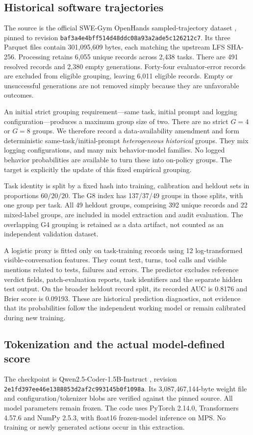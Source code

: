 \subsection{Historical software trajectories}\label{app:historical}
The source is the official SWE-Gym OpenHands sampled-trajectory dataset \citep{swegymdata,pan2025}, pinned to revision \nolinkurl{baf3a4e4bff514d48ddc08a93a2ade5c126212c7}. Its three Parquet files contain 301,095,609 bytes, each matching the upstream LFS SHA-256. Processing retains 6,055 unique records across 2,438 tasks. There are 491 resolved records and 2,380 empty generations. Forty-four evaluator-error records are excluded from eligible grouping, leaving 6,011 eligible records. Empty or unsuccessful generations are not removed simply because they are unfavorable outcomes.

An initial strict grouping requirement---same task, initial prompt and logging configuration---produces a maximum group size of two. There are no strict $G=4$ or $G=8$ groups. We therefore record a data-availability amendment and form deterministic same-task/initial-prompt \emph{heterogeneous historical} groups. They mix logging configurations, and many mix behavior-model families. No logged behavior probabilities are available to turn these into on-policy groups. The target is explicitly the update of this fixed empirical grouping.

Task identity is split by a fixed hash into training, calibration and heldout sets in proportions $60/20/20$. The G8 index has 137/37/49 groups in those splits, with one group per task. All 49 heldout groups, comprising 392 unique records and 22 mixed-label groups, are included in model extraction and audit evaluation. The overlapping G4 grouping is retained as a data artifact, not counted as an independent validation dataset.

A logistic proxy is fitted only on task-training records using 12 log-transformed visible-conversation features. They count text, turns, tool calls and visible mentions related to tests, failures and errors. The predictor excludes reference verdict fields, patch-evaluation reports, task identifiers and the separate hidden test output. On the broader heldout record split, its recorded AUC is 0.8176 and Brier score is 0.09193. These are historical prediction diagnostics, not evidence that its probabilities follow the independent working model or remain calibrated during new training.

\subsection{Tokenization and the actual model-defined score}\label{app:frozen}
The checkpoint is Qwen2.5-Coder-1.5B-Instruct \citep{qwenmodel}, revision \nolinkurl{2e1fd397ee46e1388853d2af2c993145b0f1098a}. Its 3,087,467,144-byte weight file and configuration/tokenizer blobs are verified against the pinned source. All model parameters remain frozen. The code uses PyTorch 2.14.0, Transformers 4.57.6 and NumPy 2.5.3, with float16 frozen-model inference on MPS. No training or newly generated actions occur in this extraction.

